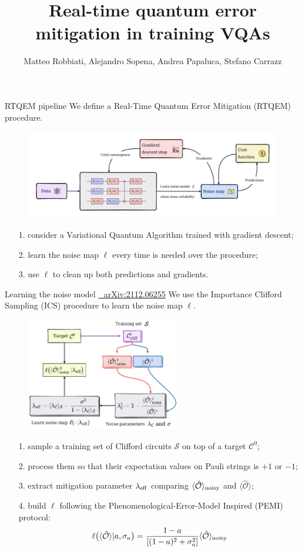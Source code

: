 \documentclass[8pt, xcolor={svgnames}, hyperref={linkcolor=black}]{beamer}
\title{Real-time quantum error mitigation in training VQAs}
\date{}
\author[Matteo Robbiati, Alejandro Sopena, Andrea Papaluca, Stefano Carrazza]{Matteo Robbiati, Alejandro Sopena, Andrea Papaluca, Stefano Carrazz}
\begin{document}
\begin{frame}{RTQEM pipeline}
We define a Real-Time Quantum Error Mitigation (RTQEM) procedure.
\begin{figure}
    \includegraphics[width=1\textwidth]{figures/rtqem.pdf}
\end{figure}
\begin{itemize}[noitemsep]
\item[1.] consider a Variational Quantum Algorithm trained with gradient descent;
\item[2.] learn the noise map $\ell$ every time is needed over the procedure;
\item[3.] use $\ell$ to clean up both predictions and gradients.
\end{itemize}
\end{frame}

\begin{frame}{Learning the noise model \hfill \href{https://arxiv.org/abs/2112.06255}{\faBook\,\, arXiv:2112.06255}}
We use the Importance Clifford Sampling (ICS) procedure to learn the noise map $\ell$.
\begin{figure}
    \includegraphics[width=0.6\textwidth]{figures/ics.pdf}
\end{figure}
\begin{itemize}[noitemsep]
\item[1.] sample a training set of Clifford circuits $\mathcal{S}$ on top of a target $\mathcal{C}^0$;
\item[2.] process them so that their expectation values on Pauli strings is  $+1$ or $-1$;
\item[3.] extract mitigation parameter $\lambda_{\rm eff}$ comparing $\langle \hat{\mathcal{O}}\rangle_{\rm noisy}$ and $\langle \hat{\mathcal{O}}\rangle$;
\item[4.] build $\ell$ following the Phenomenological-Error-Model Inspired (PEMI) protocol:
$$ \ell\bigl( \langle \hat{\mathcal{O}} \rangle | a, \sigma_a \bigr) = \frac{1-a}{[(1-a)^2 + 
\sigma_a^2]} \langle \hat{\mathcal{O}} \rangle_{\rm noisy} $$
\end{itemize}
\end{frame}
\end{document}
